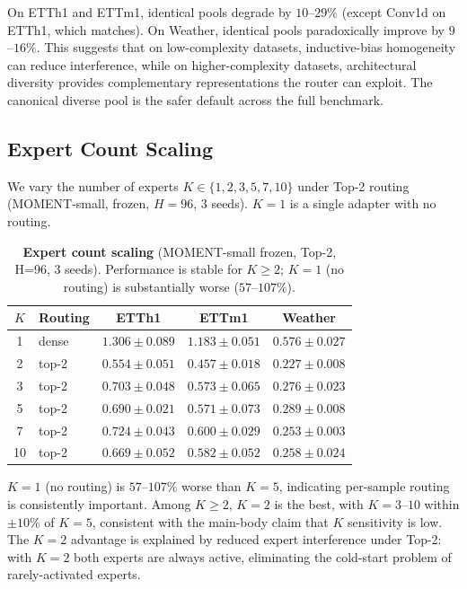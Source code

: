 \documentclass{article}
\begin{document}
On ETTh1 and ETTm1, identical pools degrade by $10$--$29\%$ (except Conv1d on ETTh1, which matches). On Weather, identical pools paradoxically improve by $9$--$16\%$. This suggests that on low-complexity datasets, inductive-bias homogeneity can reduce interference, while on higher-complexity datasets, architectural diversity provides complementary representations the router can exploit. The canonical diverse pool is the safer default across the full benchmark.

\subsection{Expert Count Scaling}

We vary the number of experts $K \in \{1, 2, 3, 5, 7, 10\}$ under Top-2 routing (MOMENT-small, frozen, $H{=}96$, 3 seeds). $K{=}1$ is a single adapter with no routing.

\begin{table}[!htbp]
\centering
\caption{\textbf{Expert count scaling} (MOMENT-small frozen, Top-2, H=96, 3 seeds). Performance is stable for $K{\geq}2$; $K{=}1$ (no routing) is substantially worse ($57$--$107\%$).}
\label{tab:expert_count}
\small
\begin{tabular}{@{}clccc@{}}
\toprule
$K$ & Routing & ETTh1 & ETTm1 & Weather \\
\midrule
1  & dense  & $1.306 \pm 0.089$ & $1.183 \pm 0.051$ & $0.576 \pm 0.027$ \\
2  & top-2  & $\mathbf{0.554 \pm 0.051}$ & $\mathbf{0.457 \pm 0.018}$ & $\mathbf{0.227 \pm 0.008}$ \\
3  & top-2  & $0.703 \pm 0.048$ & $0.573 \pm 0.065$ & $0.276 \pm 0.023$ \\
5  & top-2  & $0.690 \pm 0.021$ & $0.571 \pm 0.073$ & $0.289 \pm 0.008$ \\
7  & top-2  & $0.724 \pm 0.043$ & $0.600 \pm 0.029$ & $0.253 \pm 0.003$ \\
10 & top-2  & $0.669 \pm 0.052$ & $0.582 \pm 0.052$ & $0.258 \pm 0.024$ \\
\bottomrule
\end{tabular}
\end{table}

$K{=}1$ (no routing) is $57$--$107\%$ worse than $K{=}5$, indicating per-sample routing is consistently important. Among $K \geq 2$, $K{=}2$ is the best, with $K{=}3$--$10$ within ${\pm}10\%$ of $K{=}5$, consistent with the main-body claim that $K$ sensitivity is low. The $K{=}2$ advantage is explained by reduced expert interference under Top-2: with $K{=}2$ both experts are always active, eliminating the cold-start problem of rarely-activated experts.
\end{document}
